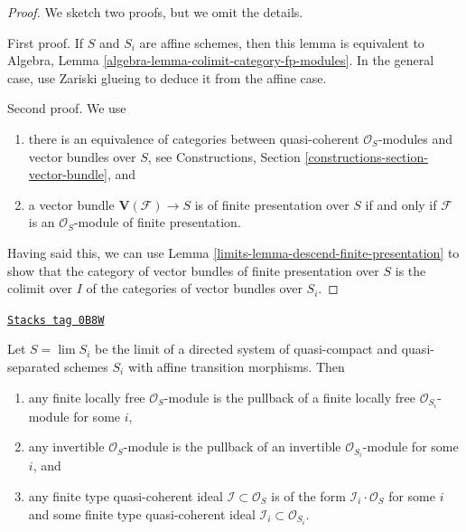 \begin{proof}

We sketch two proofs, but we omit the details.

\medskip\noindent
First proof. If $S$ and $S_i$ are affine schemes, then this lemma
is equivalent to
Algebra, Lemma \ref{algebra-lemma-colimit-category-fp-modules}.
In the general case, use Zariski glueing to deduce it from the affine case.

\medskip\noindent
Second proof. We use
\begin{enumerate}
\item there is an equivalence of categories between quasi-coherent
$\mathcal{O}_S$-modules and vector bundles over $S$, see
Constructions, Section \ref{constructions-section-vector-bundle}, and
\item a vector bundle $\mathbf{V}(\mathcal{F}) \to S$ is
of finite presentation over $S$ if and only if $\mathcal{F}$
is an $\mathcal{O}_S$-module of finite presentation.
\end{enumerate}
Having said this, we can use Lemma \ref{limits-lemma-descend-finite-presentation}
to show that the category of vector bundles of finite
presentation over $S$ is the colimit over $I$
of the categories of vector bundles over $S_i$.
\end{proof}

\begin{lemma}
\label{limits-lemma-descend-invertible-modules}
\href{https://stacks.math.columbia.edu/tag/0B8W}{\texttt{Stacks tag 0B8W}}

Let $S = \lim S_i$ be the limit of a directed system of quasi-compact and
quasi-separated schemes $S_i$ with affine transition morphisms. Then
\begin{enumerate}
\item any finite locally free $\mathcal{O}_S$-module is the pullback
of a finite locally free $\mathcal{O}_{S_i}$-module for some $i$,
\item any invertible $\mathcal{O}_S$-module is the pullback of an invertible
$\mathcal{O}_{S_i}$-module for some $i$, and
\item any finite type quasi-coherent ideal $\mathcal{I} \subset \mathcal{O}_S$
is of the form $\mathcal{I}_i \cdot \mathcal{O}_S$ for some $i$ and some
finite type quasi-coherent ideal $\mathcal{I}_i \subset \mathcal{O}_{S_i}$.
\end{enumerate}
\end{lemma}

